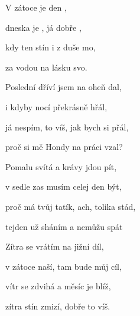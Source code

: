 

\zs
V zátoce  je  den ,

dneska je , já dobře ,

kdy ten stín  i z duše mo,

za vodou  na lásku svo.
\ks

\zs
Poslední dříví jsem na oheň dal,

i kdyby nocí překrásně hřál,

já nespím, to víš, jak bych si přál,

proč si mě Hondy na práci vzal?
\ks

\zs
Pomalu svítá a krávy jdou pít,

v sedle zas musím celej den být,

proč má tvůj tatík, ach, tolika stád,

tejden už sháním a nemůžu spát
\ks

\zs
Zítra se vrátím na jižní díl,

v zátoce naší, tam bude můj cíl,

vítr se zdvihá a měsíc je blíž,

zítra stín zmizí, dobře to víš.
\ks

\kp























